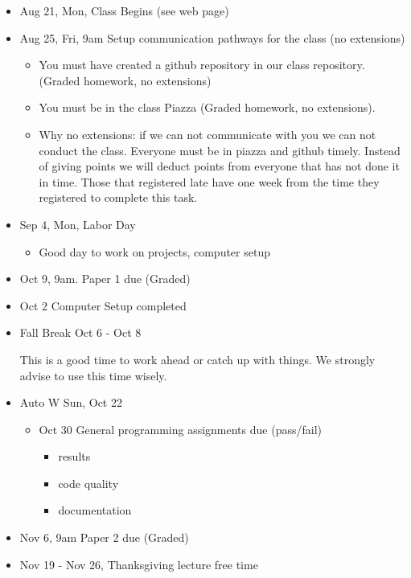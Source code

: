 \begin{itemize}
\item
  Aug 21, Mon, Class Begins (see web page)
\item
  Aug 25, Fri, 9am Setup communication pathways for the class (no
  extensions)

  \begin{itemize}

  \item
    You must have created a github repository in our class repository.
    (Graded homework, no extensions)
  \item
    You must be in the class Piazza (Graded homework, no extensions).
  \item
    Why no extensions: if we can not communicate with you we can not
    conduct the class. Everyone must be in piazza and github timely.
    Instead of giving points we will deduct points from everyone that
    has not done it in time. Those that registered late have one week
    from the time they registered to complete this task.
  \end{itemize}
\item
  Sep 4, Mon, Labor Day

  \begin{itemize}

  \item
    Good day to work on projects, computer setup
  \end{itemize}
\item
  Oct 9, 9am. Paper 1 due (Graded)
\item
  Oct 2 Computer Setup completed
\item
  Fall Break Oct 6 - Oct 8

  This is a good time to work ahead or catch up with things. We strongly
  advise to use this time wisely.
\item
  Auto W Sun, Oct 22

  \begin{itemize}

  \item
    Oct 30 General programming assignments due (pass/fail)

    \begin{itemize}

    \item
      results
    \item
      code quality
    \item
      documentation
    \end{itemize}
  \end{itemize}
\item
  Nov 6, 9am Paper 2 due (Graded)
\item
  Nov 19 - Nov 26, Thanksgiving lecture free time


\end{itemize}
